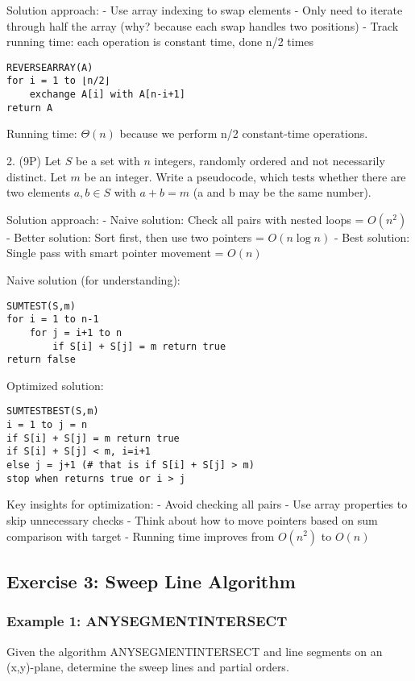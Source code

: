 Solution approach:
- Use array indexing to swap elements
- Only need to iterate through half the array (why? because each swap handles two positions)
- Track running time: each operation is constant time, done n/2 times

\begin{verbatim}
REVERSEARRAY(A)
for i = 1 to ⌊n/2⌋
    exchange A[i] with A[n-i+1]
return A
\end{verbatim}

Running time: $\Theta(n)$ because we perform n/2 constant-time operations.

2. (9P) Let $S$ be a set with $n$ integers, randomly ordered and not necessarily distinct. Let $m$ be an integer. Write a pseudocode, which tests whether there are two elements $a,b \in S$ with $a + b = m$ (a and b may be the same number).

Solution approach:
- Naive solution: Check all pairs with nested loops = $O(n^2)$
- Better solution: Sort first, then use two pointers = $O(n \log n)$
- Best solution: Single pass with smart pointer movement = $O(n)$

Naive solution (for understanding):
\begin{verbatim}
SUMTEST(S,m)
for i = 1 to n-1
    for j = i+1 to n
        if S[i] + S[j] = m return true
return false
\end{verbatim}

Optimized solution:
\begin{verbatim}
SUMTESTBEST(S,m)
i = 1 to j = n
if S[i] + S[j] = m return true
if S[i] + S[j] < m, i=i+1
else j = j+1 (# that is if S[i] + S[j] > m)
stop when returns true or i > j
\end{verbatim}

Key insights for optimization:
- Avoid checking all pairs
- Use array properties to skip unnecessary checks
- Think about how to move pointers based on sum comparison with target
- Running time improves from $O(n^2)$ to $O(n)$

\subsection*{Exercise 3: Sweep Line Algorithm}

\subsubsection*{Example 1: ANYSEGMENTINTERSECT}

Given the algorithm ANYSEGMENTINTERSECT and line segments on an (x,y)-plane, determine the sweep lines and partial orders.


